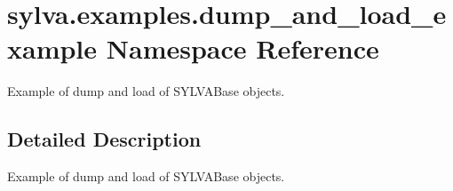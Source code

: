 \hypertarget{namespacesylva_1_1examples_1_1dump__and__load__example}{}\section{sylva.\+examples.\+dump\+\_\+and\+\_\+load\+\_\+example Namespace Reference}
\label{namespacesylva_1_1examples_1_1dump__and__load__example}


Example of dump and load of S\+Y\+L\+V\+A\+Base objects.  




\subsection{Detailed Description}
Example of dump and load of S\+Y\+L\+V\+A\+Base objects. 